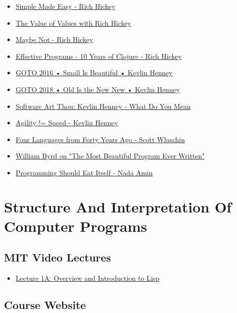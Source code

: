 \documentclass[11pt]{article}
\begin{document}
\begin{itemize}
\item \href{https://www.infoq.com/presentations/Simple-Made-Easy/}{Simple Made Easy - Rich Hickey}
\item \href{https://www.youtube.com/watch?v=-6BsiVyC1kM}{The Value of Values with Rich Hickey}
\item \href{https://www.youtube.com/watch?v=YR5WdGrpoug}{Maybe Not - Rich Hickey}
\item \href{https://www.youtube.com/watch?v=2V1FtfBDsLU}{Effective Programs - 10 Years of Clojure - Rich Hickey}
\item \href{https://www.youtube.com/watch?v=B3b4tremI5o}{GOTO 2016 • Small Is Beautiful • Kevlin Henney}
\item \href{https://www.youtube.com/watch?v=AbgsfeGvg3E}{GOTO 2018 • Old Is the New New • Kevlin Henney}
\item \href{https://www.youtube.com/watch?v=5cafjDPPtJ0}{Software Art Thou: Kevlin Henney - What Do You Mean}
\item \href{https://www.youtube.com/watch?v=xjf3eW5lftw}{Agility != Speed - Kevlin Henney}
\item \href{https://www.youtube.com/watch?v=0fpDlAEQio4}{Four Languages from Forty Years Ago - Scott Wlaschin}
\item \href{https://www.youtube.com/watch?v=OyfBQmvr2Hc}{William Byrd on "The Most Beautiful Program Ever Written"}
\item \href{https://www.youtube.com/watch?v=SrKj4hYic5A}{Programming Should Eat Itself - Nada Amin}
\end{itemize}

\section{Structure And Interpretation Of Computer Programs}
\label{sec:org92e95a7}

\subsection{MIT Video Lectures}
\label{sec:orgec64404}

\begin{itemize}
\item \href{https://www.youtube.com/watch?list=PLE18841CABEA24090\&v=-J\_xL4IGhJA}{Lecture 1A: Overview and Introduction to Lisp}
\end{itemize}

\subsection{Course Website}
\label{sec:org0220d06}
\end{document}
